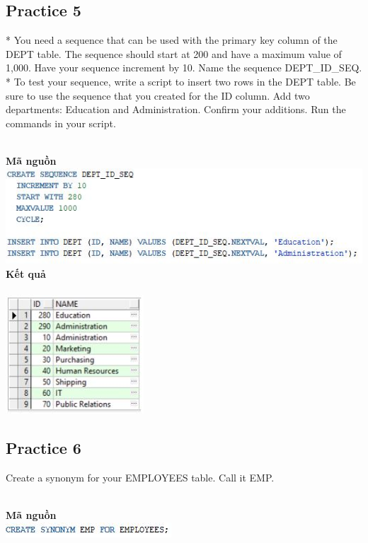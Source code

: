 \documentclass[12pt,a4paper]{report}
\begin{document}
\subsection{Practice 5}
\begin{boxedminipage}[t]{15.5cm}
* You need a sequence that can be used with the primary key column of the DEPT table. 
The sequence should start at 200 and have a maximum value of 1,000. Have your sequence increment by 10. Name the sequence DEPT\_ID\_SEQ.\\ * To test your sequence, write a script to insert two rows in the DEPT table. 
Be sure to use the sequence that you created for the ID column. Add two departments: Education and Administration. 
Confirm your additions. Run the commands in your script.
\end{boxedminipage}
\newline
\\
\textbf{Mã nguồn}
\\
\newline
\includegraphics[scale=1]{p53.jpg}\\
\textbf{Kết quả}\\\\
\includegraphics[scale=.9]{kp53.jpg}

\subsection{Practice 6}
\begin{boxedminipage}[t]{12.5cm}
	Create a synonym for your EMPLOYEES table. Call it EMP.
\end{boxedminipage}
\newline
\\
\textbf{Mã nguồn}
\\
\newline
\includegraphics[scale=1]{p63.jpg}
\end{document}
